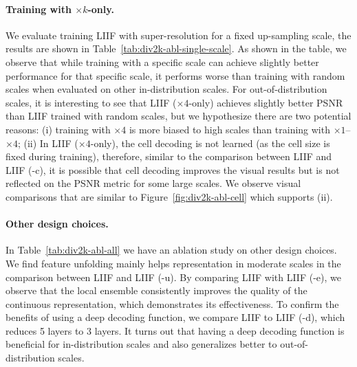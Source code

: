 \documentclass[final]{cvpr}
\begin{document}
\paragraph{Training with $\times k$-only.} We evaluate training LIIF with super-resolution for a fixed up-sampling scale, the results are shown in Table~\ref{tab:div2k-abl-single-scale}. As shown in the table, we observe that while training with a specific scale can achieve slightly better performance for that specific scale, it performs worse than training with random scales when evaluated on other in-distribution scales. For out-of-distribution scales, it is interesting to see that LIIF ($\times 4$-only) achieves slightly better PSNR than LIIF trained with random scales, but we hypothesize there are two potential reasons: (i) training with $\times 4$ is more biased to high scales than training with $\times 1$--$\times 4$; (ii) In LIIF ($\times 4$-only), the cell decoding is not learned (as the cell size is fixed during training), therefore, similar to the comparison between LIIF and LIIF (-c), it is possible that cell decoding improves the visual results but is not reflected on the PSNR metric for some large scales. We observe visual comparisons that are similar to Figure~\ref{fig:div2k-abl-cell} which supports (ii).

\vspace{-1em}
\paragraph{Other design choices.} In Table~\ref{tab:div2k-abl-all} we have an ablation study on other design choices. We find feature unfolding mainly helps representation in moderate scales in the comparison between LIIF and LIIF (-u). By comparing LIIF with LIIF (-e), we observe that the local ensemble consistently improves the quality of the continuous representation, which demonstrates its effectiveness. To confirm the benefits of using a deep decoding function, we compare LIIF to LIIF (-d), which reduces 5 layers to 3 layers. It turns out that having a deep decoding function is beneficial for in-distribution scales and also generalizes better to out-of-distribution scales.
\end{document}
